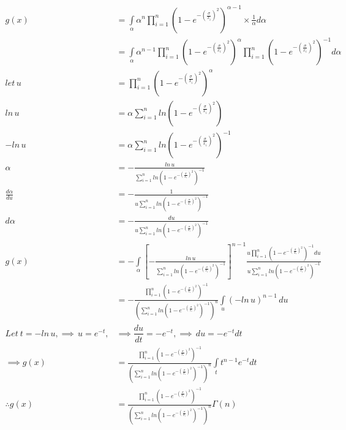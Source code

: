 \documentclass[a4paper,12pt]{report}
\begin{document}
\begin{equation}\label{3.19}
\begin{split}
g(x)&=\int\limits_{\alpha}\alpha^n \prod\limits_{ i=1 }^{n}\left(1-e^{-\left(\frac{\sigma}{x_i}\right)^2}\right)^{\alpha-1}\times \frac{1}{\alpha} d\alpha \\
&=\int\limits_{\alpha}\alpha^{n-1} \prod\limits_{ i=1 }^{n}\left(1-e^{-\left(\frac{\sigma}{x_i}\right)^2}\right)^{\alpha}\prod\limits_{ i=1 }^{n}\left(1-e^{-\left(\frac{\sigma}{x_i}\right)^2}\right)^{-1} d\alpha\\
let\, u&=\prod\limits_{ i=1 }^{n}\left(1-e^{-\left(\frac{\sigma}{x_i}\right)^2}\right)^{\alpha}\\
ln\, u&=\alpha\sum\limits_{ i=1 }^{n}ln\left(1-e^{-\left(\frac{\sigma}{x_i}\right)^2}\right)\\
-ln\, u&=\alpha\sum\limits_{ i=1 }^{n}ln\left(1-e^{-\left(\frac{\sigma}{x_i}\right)^2}\right)^{-1}\\
\alpha&=-\frac{ln\,u}{\sum\limits_{ i=1 }^{n}ln\left(1-e^{-\left(\frac{\sigma}{x_i}\right)^2}\right)^{-1}}\\
\frac{d\alpha}{du}&= -\frac{1}{u\sum\limits_{ i=1 }^{n}ln\left(1-e^{-\left(\frac{\sigma}{x_i}\right)^2}\right)^{-1}}\\
d\alpha&=-\frac{du}{u\sum\limits_{ i=1 }^{n}ln\left(1-e^{-\left(\frac{\sigma}{x_i}\right)^2}\right)^{-1}}\\
g(x)&=-\int\limits_{\alpha}\left[-\frac{ln\,u}{\sum\limits_{ i=1 }^{n}ln\left(1-e^{-\left(\frac{\sigma}{x_i}\right)^2}\right)^{-1}}\right]^{n-1}\frac{u\prod\limits_{ i=1 }^{n}\left(1-e^{-\left(\frac{\sigma}{x_i}\right)^2}\right)^{-1}du}{u\sum\limits_{ i=1 }^{n}ln\left(1-e^{-\left(\frac{\sigma}{x_i}\right)^2}\right)^{-1}}\\
&=-\frac{\prod\limits_{ i=1 }^{n}\left(1-e^{-\left(\frac{\sigma}{x_i}\right)^2}\right)^{-1}}{\left(\sum\limits_{ i=1 }^{n}ln\left(1-e^{-\left(\frac{\sigma}{x_i}\right)^2}\right)^{-1}\right)^n}\int\limits_{u}(-ln\,u)^{n-1}\,du\\
Let\ t=-ln\,u,\implies\,u=e^{-t},&\implies\dfrac{du}{dt}=-e^{-t},\implies \, du=-e^{-t}dt\\
\implies g(x)&=\frac{\prod\limits_{ i=1 }^{n}\left(1-e^{-\left(\frac{\sigma}{x_i}\right)^2}\right)^{-1}}{\left(\sum\limits_{ i=1 }^{n}ln\left(1-e^{-\left(\frac{\sigma}{x_i}\right)^2}\right)^{-1}\right)^n}\int\limits_{t}t^{n-1}e^{-t}dt\\
\therefore g(x)&=\frac{\prod\limits_{ i=1 }^{n}\left(1-e^{-\left(\frac{\sigma}{x_i}\right)^2}\right)^{-1}}{\left(\sum\limits_{ i=1 }^{n}ln\left(1-e^{-\left(\frac{\sigma}{x_i}\right)^2}\right)^{-1}\right)^n}\Gamma(n)
\end{split}
\end{equation}
\end{document}
